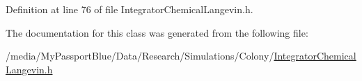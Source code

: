 \-Definition at line 76 of file \-Integrator\-Chemical\-Langevin.\-h.



\-The documentation for this class was generated from the following file\-:\begin{DoxyCompactItemize}
\item 
/media/\-My\-Passport\-Blue/\-Data/\-Research/\-Simulations/\-Colony/\hyperlink{_integrator_chemical_langevin_8h}{\-Integrator\-Chemical\-Langevin.\-h}\end{DoxyCompactItemize}
